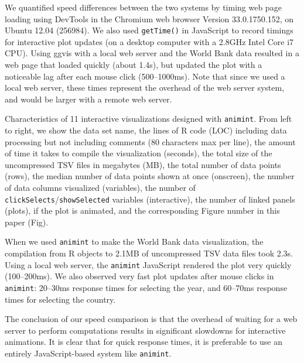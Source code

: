\documentclass[journal]{vgtc}\usepackage[]{graphicx}\usepackage[]{color}
\begin{document}
We quantified speed differences between the two systems by timing web
page loading using DevTools in the Chromium web browser Version
33.0.1750.152, on Ubuntu 12.04 (256984). We also used \texttt{getTime()}
in JavaScript to record timings for interactive plot updates (on a
desktop computer with a 2.8GHz Intel Core i7 CPU). Using ggvis with a
local web server and the World Bank data resulted in a web page that
loaded quickly (about 1.4s), but updated the plot with a noticeable
lag after each mouse click (500--1000ms). Note that since we used a
local web server, these times represent the overhead of the web server
system, and would be larger with a remote web server.

\begin{table}[b!] %
  \centering
  
  \vskip 0.2cm
  \caption{Characteristics of 11 interactive visualizations designed with
    \texttt{animint}. From left to right, we show the data set name, the
    lines of R code (LOC) including data processing but not including comments
    (80 characters max per line),
    the amount of time it takes to compile the visualization (seconds),
    the total size of the uncompressed TSV files in megabytes (MB),
    the total number of data points (rows),
    the median number of data points shown at once (onscreen),
    the number of data columns visualized (variables),
    the number of \texttt{clickSelects}/\texttt{showSelected} variables (interactive),
    the number of linked panels (plots),
    if the plot is animated,
    and the corresponding Figure number in this paper (Fig).
  }
\label{tab:examples}
\end{table}

When we used \texttt{animint} to make the World Bank data visualization, the
compilation from R objects to 2.1MB of uncompressed TSV data files
took 2.3s. Using a local web server, the \texttt{animint} JavaScript rendered
the plot very quickly (100--200ms). We also observed very fast plot
updates after mouse clicks in \texttt{animint}: 20--30ms response times for
selecting the year, and 60--70ms response times for selecting the
country.

The conclusion of our speed comparison is that the overhead of waiting
for a web server to perform computations results in significant
slowdowns for interactive animations. It is clear that for quick
response times, it is preferable to use an entirely JavaScript-based
system like \texttt{animint}.
\end{document}
